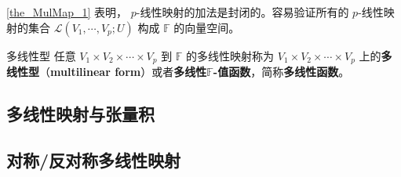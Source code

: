 \autoref{the_MulMap_1} 表明， $p$-线性映射的加法是封闭的。容易验证所有的 $p$-线性映射的集合 $\mathcal{L}(V_1,\cdots,V_p;U)$ 构成 $\mathbb{F}$ 的向量空间。


\begin{definition}{多线性型}\label{def_MulMap_2}
任意 $V_1\times V_2\times\cdots\times V_p$ 到 $\mathbb{F}$ 的多线性映射称为 $V_1\times V_2\times\cdots\times V_p$ 上的\textbf{多线性型}（\textbf{multilinear form}）或者\textbf{多线性$\mathbb{F}$-值函数}，简称\textbf{多线性函数}。
\end{definition}


% 

\subsection{多线性映射与张量积}



\subsection{对称/反对称多线性映射}

